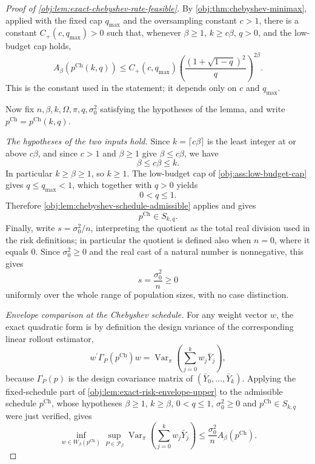 \begin{proof}[Proof of \cref{obj:lem:exact-chebyshev-rate-feasible}]
By \cref{obj:thm:chebyshev-minimax}, applied with the fixed cap \(q_{\max}\) and the oversampling constant \(c>1\), there is a constant \(C_+(c,q_{\max})>0\) such that, whenever \(\beta\ge1\), \(k\ge c\beta\), \(q>0\), and the low-budget cap holds,
\[
A_\beta\!\left(p^{\mathrm{Ch}}(k,q)\right)
\le
C_+(c,q_{\max})
\left(\frac{(1+\sqrt{1-q})^2}{q}\right)^{2\beta}.
\]
This is the constant used in the statement; it depends only on \(c\) and \(q_{\max}\).

Now fix \(n,\beta,k,\Omega,\pi,q,\sigma_0^2\) satisfying the hypotheses of the lemma, and write \(p^{\mathrm{Ch}}=p^{\mathrm{Ch}}(k,q)\).

\emph{The hypotheses of the two inputs hold.}
Since \(k=\lceil c\beta\rceil\) is the least integer at or above \(c\beta\), and since \(c>1\) and \(\beta\ge1\) give \(\beta\le c\beta\), we have
\[
\beta\le c\beta\le k .
\] %
In particular \(k\ge\beta\ge1\), so \(k\ge1\). The low-budget cap of \cref{obj:ass:low-budget-cap} gives \(q\le q_{\max}<1\), which together with \(q>0\) yields
\[
0<q\le1 .
\] %
Therefore \cref{obj:lem:chebyshev-schedule-admissible} applies and gives
\[
p^{\mathrm{Ch}}\in S_{k,q}.
\]
Finally, write \(s=\sigma_0^2/n\), interpreting the quotient as the total real division used in the risk definitions; in particular the quotient is defined also when \(n=0\), where it equals \(0\). Since \(\sigma_0^2\ge0\) and the real cast of a natural number is nonnegative, this gives
\[
s=\frac{\sigma_0^2}{n}\ge0
\]
uniformly over the whole range of population sizes, with no case distinction. %

\emph{Envelope comparison at the Chebyshev schedule.}
For any weight vector \(w\), the exact quadratic form is by definition the design variance of the corresponding linear rollout estimator,
\[
w^\prime\Gamma_P\!\left(p^{\mathrm{Ch}}\right)w
=
\operatorname{Var}_\pi\!\left(\sum_{j=0}^k w_j\bar Y_j\right),
\]
because \(\Gamma_P(p)\) is the design covariance matrix of \((\bar Y_0,\ldots,\bar Y_k)\). Applying the fixed-schedule part of \cref{obj:lem:exact-risk-envelope-upper} to the admissible schedule \(p^{\mathrm{Ch}}\), whose hypotheses \(\beta\ge1\), \(k\ge\beta\), \(0<q\le1\), \(\sigma_0^2\ge0\) and \(p^{\mathrm{Ch}}\in S_{k,q}\) were just verified, gives
\[
\inf_{w\in W_\beta(p^{\mathrm{Ch}})}
\sup_{P\in\mathcal P_\beta}
\operatorname{Var}_\pi\!\left(\sum_{j=0}^k w_j\bar Y_j\right)
\le
\frac{\sigma_0^2}{n}
A_\beta\!\left(p^{\mathrm{Ch}}\right).
\]


\end{proof}
